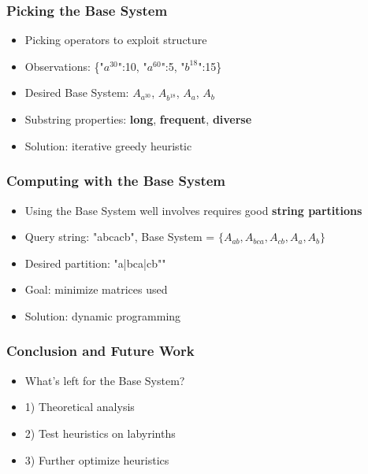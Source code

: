 \documentclass{beamer}
\begin{document}
\begin{frame}
\frametitle{Picking the Base System}
\begin{itemize}


\item Picking operators to exploit structure
\item[] Observations: \{"$a^{30}$":10, "$a^{60}$":5, "$b^{18}$":15\}

\item[] Desired Base System: $A_{a^{30}}$, $A_{b^{18}}$, $A_a$, $A_b$

\item Substring properties: 
\textbf{long}, \textbf{frequent}, \textbf{diverse}

\item Solution: iterative greedy heuristic 


\end{itemize}
\end{frame}


\begin{frame}
\frametitle{Computing with the Base System}
\begin{itemize}


\item Using the Base System well involves requires good \textbf{string partitions}

\item[] Query string: "abcacb", Base System = $\{A_{ab}, A_{bca}, A_{cb}, A_a, A_b \}$ 


\item[] Desired partition: "a|bca|cb""

\item Goal: minimize matrices used

\item Solution: dynamic programming

\end{itemize}
\end{frame}


\begin{frame}
\frametitle{Conclusion and Future Work}
\begin{itemize}

\item What's left for the Base System?
\item[] 1) Theoretical analysis

\item[] 2) Test heuristics on labyrinths

\item[] 3) Further optimize heuristics


\end{itemize}
\end{frame}
\end{document}
